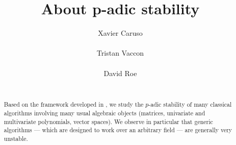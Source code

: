 \documentclass{sig-alternate}
\begin{document}
\newtheorem{theo}{Theorem}[section]
\newtheorem{lem}[theo]{Lemma}
\newtheorem{prop}[theo]{Proposition}
\newtheorem{cor}[theo]{Corollary}
\newtheorem{quest}[theo]{Question}
\newtheorem{rem}[theo]{Remark}
\newtheorem{ex}[theo]{Example}
\newtheorem{deftn}[theo]{Definition}
\newtheorem{rmk}[theo]{Remark}

\newcommand{\N}{\mathbb N}
\newcommand{\Z}{\mathbb Z}
\newcommand{\Zp}{\Z_p}
\newcommand{\Q}{\mathbb Q}
\newcommand{\Qp}{\Q_p}
\newcommand{\Fp}{\mathbb{F}_p}
\newcommand{\R}{\mathbb R}
\renewcommand{\O}{\mathcal O}
\newcommand{\OK}{\mathcal{O}_K}
\newcommand{\XX}{\mathbf X}
\newcommand{\trans}{{}^{\text t}}
\newcommand{\T}{\mathcal{T}}

\renewcommand{\prec}{\text{\rm prec}}

\newcommand{\id}{\textrm{id}}
\newcommand{\Epi}{\textrm{Epi}}

\newcommand{\lb}{\ensuremath{\llbracket}}
\newcommand{\rb}{\ensuremath{\rrbracket}}
\newcommand{\lp}{(\!(}
\newcommand{\rp}{)\!)}
\newcommand{\col}{\: : \:}

\def\todo#1{\ \!\!{\color{red} #1}}
\def\todofor#1#2{\ \!\!{\color{purple} {\bf #1}: #2}}

\def\binom#1#2{\Big(\begin{array}{cc} #1 \\ #2 \end{array}\Big)}

\title{About p-adic stability}

\author{
\alignauthor Xavier Caruso\\
  \\
\alignauthor Tristan Vaccon\\
  \\
\alignauthor David Roe \\
  \\
}

\maketitle

\begin{abstract}
Based on the framework developed in \cite{caruso-roe-vaccon:14a}, we study the 
$p$-adic stability of many classical algorithms involving many usual
algebraic objects (matrices, univariate and multivariate polynomials,
vector spaces). We observe in particular that generic algorithms ---
which are designed to work over an arbitrary field --- are generally
very unstable.
\end{abstract}
\end{document}
